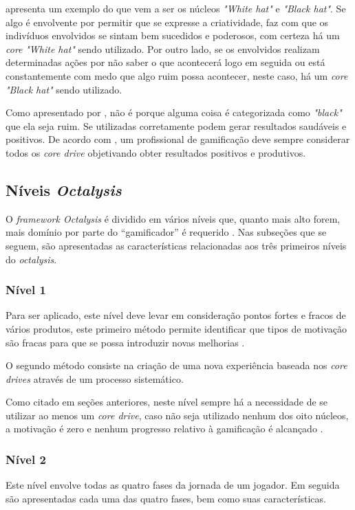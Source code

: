  apresenta um exemplo do que vem a ser os núcleos \textit{"White hat"} e \textit{"Black hat"}. Se algo é envolvente
por permitir que se expresse a criatividade, faz com que os indivíduos envolvidos se sintam bem sucedidos e poderosos, com certeza há um \textit{core} 
\textit{"White hat"} sendo utilizado. Por outro lado, se os envolvidos realizam determinadas ações por não saber o que acontecerá logo em seguida ou está
constantemente com medo que algo ruim possa acontecer, neste caso, há um \textit{core} \textit{"Black hat"} sendo utilizado.

Como apresentado por , não é porque alguma coisa é categorizada como \textit{"black"} que ela seja ruim. Se utilizadas
corretamente podem gerar resultados saudáveis e positivos. De acordo com , um profissional de gamificação deve sempre considerar
todos os \textit{core drive} objetivando obter resultados positivos e produtivos.


\subsection{Níveis \textit{Octalysis}}

O \textit{framework Octalysis} é dividido em vários níveis que, quanto mais alto forem, mais domínio por parte do ``gamificador'' é requerido \cite{chou2017actionable}.
Nas subseções que se seguem, são apresentadas as características relacionadas aos três primeiros níveis do \textit{octalysis}.

\subsubsection{Nível 1}
Para ser aplicado, este nível deve levar em consideração pontos fortes e fracos de vários produtos, este primeiro método permite identificar
que tipos de motivação são fracas para que se possa introduzir novas melhorias \cite{chou2017actionable}.

O segundo método consiste na criação de uma nova experiência baseada nos \textit{core drives} através de um processo sistemático.

Como citado em seções anteriores, neste nível sempre há a necessidade de se utilizar ao menos um \textit{core drive}, caso não seja utilizado nenhum
dos oito núcleos, a motivação é zero e nenhum progresso relativo à gamificação é alcançado \cite{chou2017actionable}.

\subsubsection{Nível 2}
Este nível envolve todas as quatro fases da jornada de um jogador. Em seguida são apresentadas cada uma das quatro fases, bem como suas características.

